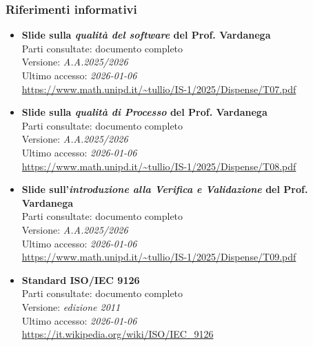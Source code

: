 \documentclass[a4paper,12pt]{article}
\begin{document}
\subsubsection{Riferimenti informativi} \label{sec:riferimenti_informativi}
\begin{itemize}
    \raggedright
    \item \textbf{Slide sulla \emph{qualità del software} del Prof. Vardanega}\\
        Parti consultate: documento completo\\
        Versione: \textit{A.A.2025/2026}\\
        Ultimo accesso: \textit{2026-01-06}\\
        \url{https://www.math.unipd.it/~tullio/IS-1/2025/Dispense/T07.pdf}
    \item \textbf{Slide sulla \emph{qualità di Processo} del Prof. Vardanega}\\
        Parti consultate: documento completo\\
        Versione: \textit{A.A.2025/2026}\\
        Ultimo accesso: \textit{2026-01-06}\\
        \url{https://www.math.unipd.it/~tullio/IS-1/2025/Dispense/T08.pdf}
    \item \textbf{Slide sull'\emph{introduzione alla Verifica e Validazione} del Prof. Vardanega}\\
        Parti consultate: documento completo\\
        Versione: \textit{A.A.2025/2026}\\
        Ultimo accesso: \textit{2026-01-06}\\
        \url{https://www.math.unipd.it/~tullio/IS-1/2025/Dispense/T09.pdf}
    \item \textbf{Standard ISO/IEC 9126}\\
        Parti consultate: documento completo\\
        Versione: \textit{edizione 2011}\\
        Ultimo accesso: \textit{2026-01-06}\\
        \url{https://it.wikipedia.org/wiki/ISO/IEC_9126} %
        
        \pagebreak %
        

\end{itemize}
\end{document}
